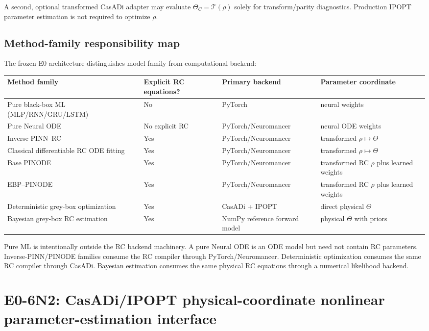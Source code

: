 \documentclass[11pt]{article}
\begin{document}
A second, optional transformed CasADi adapter may evaluate
$\Theta_C=\mathcal T(\rho)$ solely for transform/parity diagnostics. Production
IPOPT parameter estimation is not required to optimize $\rho$.

\subsection{Method-family responsibility map}
The frozen E0 architecture distinguishes model family from computational
backend:
\begin{center}
\begin{tabular}{p{}p{}p{}p{}}
\toprule
Method family & Explicit RC equations? & Primary backend & Parameter coordinate\\
\midrule
Pure black-box ML (MLP/RNN/GRU/LSTM) & No & PyTorch & neural weights\\
Pure Neural ODE & No explicit RC & PyTorch/Neuromancer & neural ODE weights\\
Inverse PINN--RC & Yes & PyTorch/Neuromancer & transformed $\rho\mapsto\Theta$\\
Classical differentiable RC ODE fitting & Yes & PyTorch/Neuromancer & transformed $\rho\mapsto\Theta$\\
Base PINODE & Yes & PyTorch/Neuromancer & transformed RC $\rho$ plus learned weights\\
EBP--PINODE & Yes & PyTorch/Neuromancer & transformed RC $\rho$ plus learned weights\\
Deterministic grey-box optimization & Yes & CasADi + IPOPT & direct physical $\Theta$\\
Bayesian grey-box RC estimation & Yes & NumPy reference forward model & physical $\Theta$ with priors\\
\bottomrule
\end{tabular}
\end{center}
Pure ML is intentionally outside the RC backend machinery. A pure Neural ODE is
an ODE model but need not contain RC parameters. Inverse-PINN/PINODE families
consume the RC compiler through PyTorch/Neuromancer. Deterministic optimization
consumes the same RC compiler through CasADi. Bayesian estimation consumes the
same physical RC equations through a numerical likelihood backend.

\section{E0-6N2: CasADi/IPOPT physical-coordinate nonlinear parameter-estimation interface}
\end{document}
